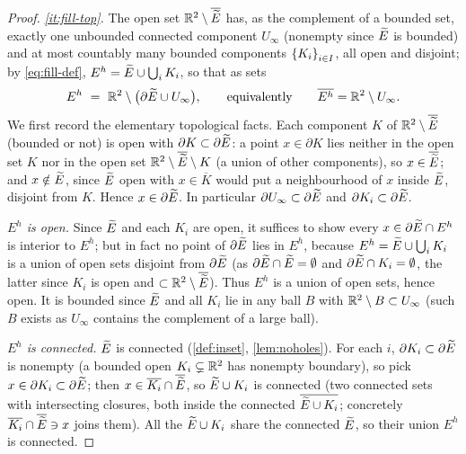 \begin{proof}
\emph{\ref{it:fill-top}.} The open set $\mathbb{R}^2\setminus\overline{\widetilde{E}}$ has, as
the complement of a bounded set, exactly one unbounded connected component
$U_\infty$ (nonempty since $\widetilde{E}$ is bounded) and at most countably many
bounded components $\left\{K_i\right\}_{i\in I}$, all open and disjoint; by
\eqref{eq:fill-def}, $E^h=\widetilde{E}\cup\bigcup_iK_i$, so that as sets
\[
   E^h\ =\ \R^2\setminus\bigl(\partial\Etil\cup U_\infty\bigr),
   \qquad\text{equivalently}\qquad
   \overline{E^h}=\R^2\setminus U_\infty .
\]
We first record the elementary topological facts. Each component $K$ of
$\mathbb{R}^2\setminus\overline{\widetilde{E}}$ (bounded or not) is open with $\partial
K\subset\partial\widetilde{E}$: a point $x\in\partial K$ lies neither in the open set
$K$ nor in the open set $\mathbb{R}^2\setminus\overline{\widetilde{E}}\setminus K$ (a union of
other components), so $x\in\overline{\widetilde{E}}$; and $x\notin\widetilde{E}$, since $\widetilde{E}$
open with $x\in\overline K$ would put a neighbourhood of $x$ inside $\widetilde{E}$,
disjoint from $K$. Hence $x\in\partial\widetilde{E}$. In particular $\partial
U_\infty\subset\partial\widetilde{E}$ and $\partial K_i\subset\partial\widetilde{E}$.

\emph{$E^h$ is open.} Since $\widetilde{E}$ and each $K_i$ are open, it suffices to
show every $x\in\partial\widetilde{E}\cap E^h$ is interior to $E^h$; but in fact no
point of $\partial\widetilde{E}$ lies in $E^h$, because $E^h=\widetilde{E}\cup\bigcup_iK_i$
is a union of open sets disjoint from $\partial\widetilde{E}$
(as $\partial\widetilde{E}\cap\widetilde{E}=\emptyset$ and $\partial\widetilde{E}\cap K_i=\emptyset$,
the latter since $K_i$ is open and $\subset\mathbb{R}^2\setminus\overline{\widetilde{E}}$).
Thus $E^h$ is a union of open sets, hence open. It is bounded since $\widetilde{E}$
and all $K_i$ lie in any ball $B$ with $\mathbb{R}^2\setminus B\subset U_\infty$
(such $B$ exists as $U_\infty$ contains the complement of a large ball).

\emph{$E^h$ is connected.} $\widetilde{E}$ is connected (\cref{def:inset},
\cref{lem:noholes}). For each $i$, $\partial K_i\subset\partial\widetilde{E}$ is
nonempty (a bounded open $K_i\subsetneq\mathbb{R}^2$ has nonempty boundary), so
pick $x\in\partial K_i\subset\partial\widetilde{E}$; then $x\in\overline{K_i}\cap
\overline{\widetilde{E}}$, so $\widetilde{E}\cup K_i$ is connected (two connected sets with
intersecting closures, both inside the connected $\overline{\widetilde{E}\cup K_i}$;
concretely $\overline{K_i}\cap\overline{\widetilde{E}}\ni x$ joins them). All the
$\widetilde{E}\cup K_i$ share the connected $\widetilde{E}$, so their union $E^h$ is
connected.


\end{proof}
